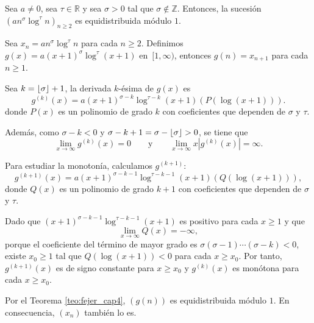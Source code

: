 \begin{example}
    Sea $a \neq 0$, sea $\tau \in \mathbb{R}$ y sea $\sigma > 0$ tal que $\sigma \notin \mathbb{Z}$.
    Entonces, la sucesión $(an^\sigma \log^\tau n)_{n\geq2}$ es equidistribuida módulo $1$.
\end{example}

\begin{resolve}
    Sea $x_n = an^\sigma \log^\tau n$ para cada $n \geq 2$. Definimos $g(x) = a(x+1)^\sigma \log^\tau (x+1)$
    en~$[1,\infty)$, entonces $g(n) = x_{n+1}$ para cada $n \geq 1$. 

    Sea $k = \lfloor \sigma \rfloor+1$, la derivada $k$-ésima de $g(x)$ es
    \[
        g^{(k)}(x) = a (x+1)^{\sigma-k} \log^{\tau-k}(x+1) \left(P(\log (x+1))\right).
    \]
    donde $P(x)$ es un polinomio de grado $k$ con coeficientes que dependen de $\sigma$ y $\tau$.

    Además, como $\sigma - k < 0$ y  $\sigma - k + 1 = \sigma - \lfloor \sigma \rfloor > 0$, se tiene que
    \[
        \lim_{x \to \infty} g^{(k)}(x) = 0
        \qquad \text{y} \qquad
        \lim_{x \to \infty} x \left|g^{(k)}(x)\right| = \infty.
    \]

    Para estudiar la monotonía, calculamos $g^{(k+1)}$:
    \[
        g^{(k+1)}(x) = a (x+1)^{\sigma-k-1} \log^{\tau-k-1}(x+1) \left(Q(\log (x+1))\right),
    \]
    donde $Q(x)$ es un polinomio de grado $k+1$ con coeficientes que dependen de $\sigma$ y $\tau$.

    Dado que $(x+1)^{\sigma-k-1} \log^{\tau-k-1}(x+1)$ es positivo para cada $x\geq1$ y que
    \[
        \lim_{x \to \infty} Q(x) = -\infty,
    \]
    porque el coeficiente del término de mayor grado es $\sigma (\sigma-1) \cdots (\sigma-k) < 0$, 
    existe $x_0 \geq 1$ tal que $Q(\log (x+1)) < 0$ para cada $x \geq x_0$. 
    Por tanto, $g^{(k+1)}(x)$ es de signo constante para $x \geq x_0$ y $g^{(k)}(x)$ es monótona para cada $x \geq x_0$.

    Por el Teorema \ref{teo:fejer_cap4}, $(g(n))$ es equidistribuida módulo $1$. En consecuencia, $(x_n)$ también lo es.
\end{resolve}